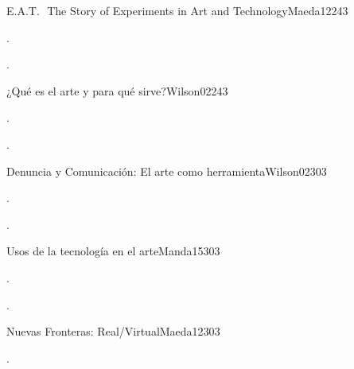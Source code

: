\begin{syllabus}
\begin{unit}{E.A.T.  The Story of Experiments in Art and Technology}{}{Maeda12}{24}{3}
   \begin{topics}
      \item . 
   \end{topics}

   \begin{learningoutcomes}
      \item .
      \end{learningoutcomes}
\end{unit}

\begin{unit}{¿Qué es el arte y para qué sirve?}{}{Wilson02}{24}{3}
   \begin{topics}
      \item . 
      \end{topics}

   \begin{learningoutcomes}
      \item .
     
   \end{learningoutcomes}
\end{unit}

\begin{unit}{Denuncia y Comunicación: El arte como herramienta}{}{Wilson02}{30}{3}
   \begin{topics}
      \item .
   \end{topics}

   \begin{learningoutcomes}
      \item .
   \end{learningoutcomes}
\end{unit}

\begin{unit}{Usos de la tecnología en el arte}{}{Manda15}{30}{3}
   \begin{topics}
      \item .
   \end{topics}

   \begin{learningoutcomes}
      \item .
   \end{learningoutcomes}
\end{unit}
\begin{unit}{Nuevas Fronteras: Real/Virtual}{}{Maeda12}{30}{3}
   \begin{topics}
      \item .
   \end{topics}


\end{unit}
\end{syllabus}
